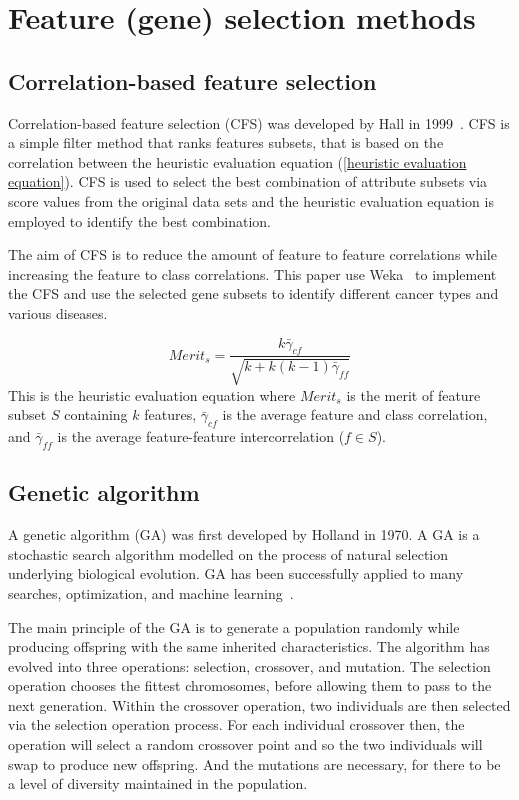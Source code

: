 \documentclass[runningheads]{llncs}
\begin{document}
\section{Feature (gene) selection methods}

\subsection{Correlation-based feature selection}\label{Correlation-based feature selection}
Correlation-based feature selection (CFS) was developed by Hall in 1999~\cite{hall1998correlation}. CFS is a simple filter method that ranks features subsets, that is based on the correlation between the heuristic evaluation equation (\ref{heuristic evaluation equation}). CFS is used to select the best combination of attribute subsets via score values from the original data sets and the heuristic evaluation equation is employed to identify the best combination. 

The aim of CFS is to reduce the amount of feature to feature correlations while increasing the feature to class correlations. This paper use Weka~\cite{frank2004data} to implement the CFS and use the selected gene subsets to identify different cancer types and various diseases.

\begin{equation}\label{heuristic evaluation equation}
	Merit_{s} = \frac{k\bar{\gamma}_{cf}}{\sqrt{k+k(k-1)\bar{\gamma}_{ff}}}
\end{equation}
This is the heuristic evaluation equation where $Merit_{s}$ is the merit of feature subset $S$ containing $k$ features, $\bar{\gamma}_{cf}$ is the average feature and class correlation, and $\bar{\gamma}_{ff}$ is the average feature-feature intercorrelation ($f\in S$).

\subsection{Genetic algorithm}\label{Genetic algorithm}
A genetic algorithm (GA) was first developed by Holland in 1970. A GA is a stochastic search algorithm modelled on the process of natural selection underlying biological evolution. GA has been successfully applied to many searches, optimization, and machine learning~\cite{holland1975adaptation}. 

The main principle of the GA is to generate a population randomly while producing offspring with the same inherited characteristics. The algorithm has evolved into three operations: selection, crossover, and mutation. The selection operation chooses the fittest chromosomes, before allowing them to pass to the next generation. Within the crossover operation, two individuals are then selected via the selection operation process. For each individual crossover then, the operation will select a random crossover point and so the two individuals will swap to produce new offspring. And the mutations are necessary, for there to be a level of diversity maintained in the population. 
\end{document}
